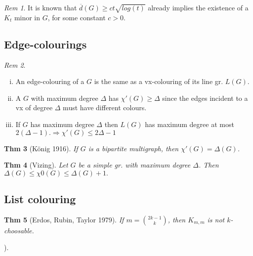 \documentclass[11pt, fleqn, a4paper, landscape]{article}
\theoremstyle{plain} %
\newtheorem{thm}{Thm}
\theoremstyle{remark} %
\newtheorem{rem}[thm]{Rem}
\theoremstyle{definition} %
\newtheorem{defi}[thm]{Def}
\begin{document}
\begin{multicols}{5}
\begin{rem}
It is known that $\overline{d}(G) \ge ct\sqrt{log(t)}$ already implies the existence of a $K_t$ minor in $G$, for some constant $c > 0$.
\end{rem}
\subsection{Edge-colourings}
\addtocounter{thm}{1}
\begin{rem}
\begin{enumerate}[(i)]
\item An edge-colouring of a $G$ is the same as a vx-colouring of its line gr. $L(G)$.
\item A $G$ with maximum degree $\Delta$ has $\chi'(G) \ge \Delta$ since the edges incident to a vx of degree $\Delta$ must have different colours.
\item If $G$ has maximum degree $\Delta$ then $L(G)$ has maximum degree at most $2(\Delta-1).\Rightarrow \chi'(G) \le 2\Delta - 1$ 
\end{enumerate}
\end{rem}

\begin{thm}[König 1916]
If $G$ is a bipartite multigraph, then $\chi'(G) = \Delta(G)$.
\end{thm}

\begin{thm}[Vizing]
Let $G$ be a simple gr. with maximum degree $\Delta$. Then $\Delta(G)\le \chi0(G) \le \Delta(G) + 1.$
\end{thm}
\addtocounter{thm}{1}

\subsection{List colouring}

\addtocounter{thm}{1}
\begin{thm}[Erdos, Rubin, Taylor 1979]
If $m = \binom{2k-1}{k}$, then $K_{m,m}$ is not $k$-choosable.
\end{thm}). 


\end{multicols}
\end{document}
